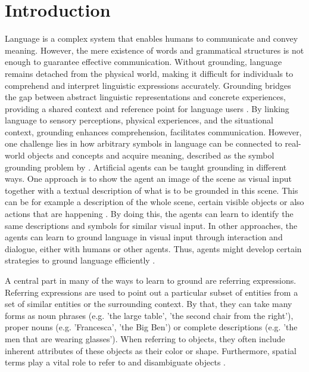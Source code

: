 \section{Introduction}
\label{sec:introduction}
Language is a complex system that enables humans to communicate and convey meaning. However, the mere existence of words and grammatical structures is not enough to guarantee effective communication. Without grounding, language remains detached from the physical world, making it difficult for individuals to comprehend and interpret linguistic expressions accurately.
Grounding bridges the gap between abstract linguistic representations and concrete experiences, providing a shared context and reference point for language users \citep{Roy2002,Bisk2020,Bender2020}. By linking language to sensory perceptions, physical experiences, and the situational context, grounding enhances comprehension, facilitates communication.
However, one challenge lies in how arbitrary symbols in language can be connected to real-world objects and concepts and acquire meaning, described as the symbol grounding problem by \citet{Harnad1990}.
Artificial agents can be taught grounding in different ways.
One approach is to show the agent an image of the scene as visual input together with a textual description of what is to be grounded in this scene.
This can be for example a description of the whole scene, certain visible objects or also actions that are happening \citep{Ahrens2022,Ilinykh2022,Lu2017,Mitchell2013}.
By doing this, the agents can learn to identify the same descriptions and symbols for similar visual input.
In other approaches, the agents can learn to ground language in visual input through interaction and dialogue, either with humans or other agents.
Thus, agents might develop certain strategies to ground language efficiently \citep{Dobnik2018a,Dobnik2021,Zarriess2019}.

A central part in many of the ways to learn to ground are referring expressions.
Referring expressions are used to point out a particular subset of entities from a set of similar entities or the surrounding context.
By that, they can take many forms as noun phrases (e.g. 'the large table', 'the second chair from the right'), proper nouns (e.g. 'Francesca', 'the Big Ben') or complete descriptions (e.g. 'the men that are wearing glasses').
When referring to objects, they often include inherent attributes of these objects as their color or shape.
Furthermore, spatial terms play a vital role to refer to and disambiguate objects \citep{Regier1996,  Dobnik2013, Dobnik2021,Ghanimifard2017, Ramisa2015}.

